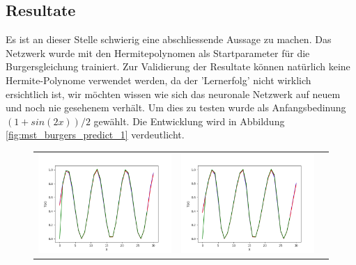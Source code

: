 \subsection{Resultate}

Es ist an dieser Stelle schwierig eine abschliessende Aussage zu machen. Das Netzwerk wurde mit den Hermitepolynomen als Startparameter für die Burgersgleichung trainiert. Zur Validierung der Resultate können natürlich keine Hermite-Polynome verwendet werden, da der 'Lernerfolg' nicht wirklich ersichtlich ist, wir möchten wissen wie sich das neuronale Netzwerk auf neuem und noch nie gesehenem verhält. Um dies zu testen wurde als Anfangsbedinung $(1 + sin(2x)) / 2$ gewählt. Die Entwicklung wird in Abbildung \ref{fig:mst_burgers_predict_1} verdeutlicht.

\begin{figure}
	\centering
	\begin{tabular}{ccc}
		\includegraphics[scale=0.27]{learning/img/burger_predict0.png} &
		\includegraphics[scale=0.27]{learning/img/burger_predict10.png} &

\end{tabular}
\end{figure}

